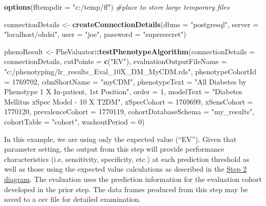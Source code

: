 \documentclass[
]{article}
\newenvironment{Shaded}{\begin{snugshade}}{\end{snugshade}}
\newcommand{\CommentTok}[1]{\textcolor[rgb]{0.56,0.35,0.01}{\textit{#1}}}
\newcommand{\DataTypeTok}[1]{\textcolor[rgb]{0.13,0.29,0.53}{#1}}
\newcommand{\DecValTok}[1]{\textcolor[rgb]{0.00,0.00,0.81}{#1}}
\newcommand{\KeywordTok}[1]{\textcolor[rgb]{0.13,0.29,0.53}{\textbf{#1}}}
\newcommand{\NormalTok}[1]{#1}
\newcommand{\OperatorTok}[1]{\textcolor[rgb]{0.81,0.36,0.00}{\textbf{#1}}}
\newcommand{\StringTok}[1]{\textcolor[rgb]{0.31,0.60,0.02}{#1}}
\begin{document}
\begin{Shaded}
\begin{Highlighting}[]
\KeywordTok{options}\NormalTok{(}\DataTypeTok{fftempdir =} \StringTok{"c:/temp/ff"}\NormalTok{) }\CommentTok{#place to store large temporary files}

\NormalTok{connectionDetails <-}\StringTok{ }\KeywordTok{createConnectionDetails}\NormalTok{(}\DataTypeTok{dbms =} \StringTok{"postgresql"}\NormalTok{,}
                                              \DataTypeTok{server =} \StringTok{"localhost/ohdsi"}\NormalTok{,}
                                              \DataTypeTok{user =} \StringTok{"joe"}\NormalTok{,}
                                              \DataTypeTok{password =} \StringTok{"supersecret"}\NormalTok{)}

\NormalTok{phenoResult <-}\StringTok{ }\NormalTok{PheValuator}\OperatorTok{::}\KeywordTok{testPhenotypeAlgorithm}\NormalTok{(}\DataTypeTok{connectionDetails =}\NormalTok{ connectionDetails,}
               \DataTypeTok{cutPoints =} \KeywordTok{c}\NormalTok{(}\StringTok{"EV"}\NormalTok{),}
               \DataTypeTok{evaluationOutputFileName =} \StringTok{"c:/phenotyping/lr_results_Eval_10X_DM_MyCDM.rds"}\NormalTok{,}
               \DataTypeTok{phenotypeCohortId =} \DecValTok{1769702}\NormalTok{,}
               \DataTypeTok{cdmShortName =} \StringTok{"myCDM"}\NormalTok{,}
               \DataTypeTok{phenotypeText =} \StringTok{"All Diabetes by Phenotype 1 X In-patient, 1st Position"}\NormalTok{,}
               \DataTypeTok{order =} \DecValTok{1}\NormalTok{,}
               \DataTypeTok{modelText =} \StringTok{"Diabetes Mellitus xSpec Model - 10 X T2DM"}\NormalTok{,}
               \DataTypeTok{xSpecCohort =} \DecValTok{1769699}\NormalTok{,}
               \DataTypeTok{xSensCohort =} \DecValTok{1770120}\NormalTok{,}
               \DataTypeTok{prevalenceCohort =} \DecValTok{1770119}\NormalTok{,}
               \DataTypeTok{cohortDatabaseSchema =} \StringTok{"my_results"}\NormalTok{,}
               \DataTypeTok{cohortTable =} \StringTok{"cohort"}\NormalTok{,}
               \DataTypeTok{washoutPeriod =} \DecValTok{0}\NormalTok{)}
\end{Highlighting}
\end{Shaded}

In this example, we are using only the expected value (``EV''). Given
that parameter setting, the output from this step will provide
performance characteristics (i.e, sensitivity, specificity, etc.) at
each prediction threshold as well as those using the expected value
calculations as described in the \href{vignettes/Figure2.png}{Step 2
diagram}. The evaluation uses the prediction information for the
evaluation cohort developed in the prior step. The data frames produced
from this step may be saved to a csv file for detailed examination.
\end{document}
